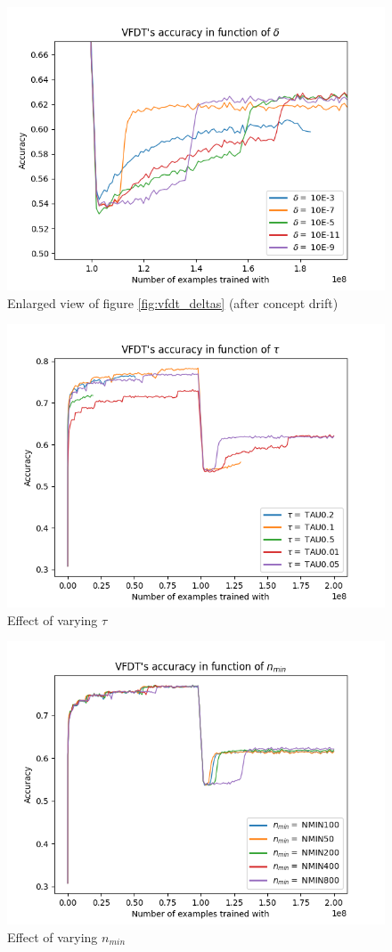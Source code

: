 \documentclass[12pt]{article}
\begin{document}
\begin{figure}
	\centering
	\includegraphics[width=.8\linewidth]{./img/vfdt_delta_zoom.png}
	\caption{Enlarged view of figure \ref{fig:vfdt_deltas} (after concept drift)}
	\label{fig:vfdt_delta_zoom2}	
\end{figure}
\begin{figure}
	\centering
	\includegraphics[width=.8\linewidth]{./img/vfdt_taus.png}
	\caption{Effect of varying $\tau$}
	\label{fig:vfdt_taus}	
\end{figure}
\begin{figure}
	\centering
	\includegraphics[width=.8\linewidth]{./img/vfdt_nmin.png}
	\caption{Effect of varying $n_{min}$}
	\label{fig:vfdt_nmins}	
\end{figure}
\end{document}
